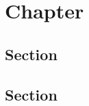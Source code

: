 \chapter{Chapter}

\section{Section}
    
\blindtext[2]
        
\blindtext[1]
        
\blindtext[2]
        
\blindtext[1]
    
\section{Section}
    
\blindtext[1]
        
\blindtext[2]
        
\blindtext[1]
        

